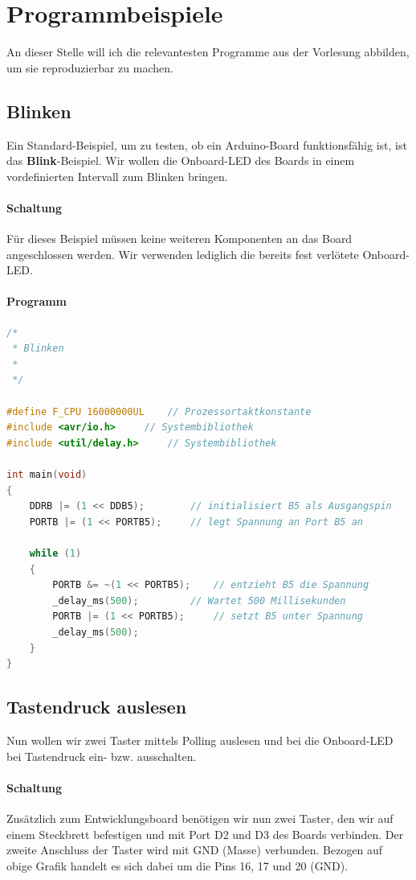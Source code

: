 \documentclass[11pt,a4paper]{scrartcl}
\begin{document}
\section{Programmbeispiele}
An dieser Stelle will ich die relevantesten Programme aus der Vorlesung abbilden, um sie reproduzierbar zu machen.
\subsection{Blinken}
Ein Standard-Beispiel, um zu testen, ob ein Arduino-Board funktionsfähig ist, ist das \textbf{Blink}-Beispiel. Wir wollen die Onboard-LED des Boards in einem vordefinierten Intervall zum Blinken bringen.
\paragraph{Schaltung} Für dieses Beispiel müssen keine weiteren Komponenten an das Board angeschlossen werden. Wir verwenden lediglich die bereits fest verlötete Onboard-LED.
\paragraph{Programm} \quad
\begin{lstlisting}[language=C]
/*
 * Blinken
 *	
 */ 

#define F_CPU 16000000UL	// Prozessortaktkonstante
#include <avr/io.h>		// Systembibliothek
#include <util/delay.h>		// Systembibliothek

int main(void)
{
	DDRB |= (1 << DDB5);		// initialisiert B5 als Ausgangspin
	PORTB |= (1 << PORTB5);		// legt Spannung an Port B5 an
	
	while (1) 
	{
		PORTB &= ~(1 << PORTB5);	// entzieht B5 die Spannung
		_delay_ms(500);			// Wartet 500 Millisekunden
		PORTB |= (1 << PORTB5);		// setzt B5 unter Spannung
		_delay_ms(500);
	}
}
\end{lstlisting}
\subsection{Tastendruck auslesen}
Nun wollen wir zwei Taster mittels Polling auslesen und bei die Onboard-LED bei Tastendruck ein- bzw. ausschalten.
\paragraph{Schaltung} Zusätzlich zum Entwicklungsboard benötigen wir nun zwei Taster, den wir auf einem Steckbrett befestigen und mit Port D2 und D3 des Boards verbinden. Der zweite Anschluss der Taster wird mit GND (Masse) verbunden. Bezogen auf obige Grafik handelt es sich dabei um die Pins 16, 17 und 20 (GND).
\end{document}
